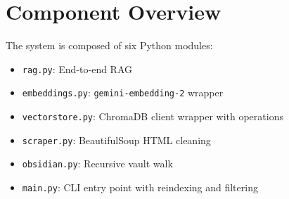 \documentclass[12pt, a4paper]{report}
\begin{document}
\section{Component Overview}

The system is composed of six Python modules:

\begin{itemize}
      \item \texttt{rag.py}: End-to-end RAG
      \item \texttt{embeddings.py}: \texttt{gemini-embedding-2} wrapper
      \item \texttt{vectorstore.py}: ChromaDB client wrapper with operations
      \item \texttt{scraper.py}: BeautifulSoup HTML cleaning
      \item \texttt{obsidian.py}: Recursive vault walk
      \item \texttt{main.py}: CLI entry point with reindexing and filtering
\end{itemize}
\end{document}
